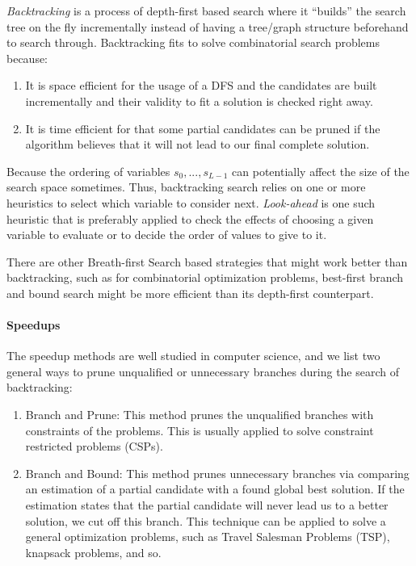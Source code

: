 \documentclass[../main.tex]{subfiles}
\begin{document}
\textit{Backtracking} is a process of depth-first based search where it ``builds'' the search tree on the fly incrementally instead of having a tree/graph structure beforehand  to search through. Backtracking fits to solve combinatorial search problems because:
\begin{enumerate}
    \item It is space efficient for the usage of a DFS and the candidates are built incrementally and their validity to fit a solution is checked right away.
    \item It is time efficient for that some partial candidates can be pruned if the algorithm believes that it will not lead to our final complete solution. 
\end{enumerate}

 Because the ordering of variables $s_0, ..., s_{L-1}$ can potentially affect the size of the search space sometimes. Thus, backtracking search relies on one or more heuristics to select which variable to consider next. \textit{Look-ahead} is one such heuristic that is preferably applied to check the effects of choosing a given variable to evaluate or to decide the order of values to give to it. 
 
 There are other Breath-first Search based strategies that might work better than backtracking, such as  for combinatorial optimization problems, best-first branch and bound search might be more efficient than its depth-first counterpart. 

\paragraph{Speedups}

The speedup methods are well studied in computer science, and we list two general ways to prune unqualified or unnecessary branches during the search of backtracking:
\begin{enumerate}
    \item Branch and Prune: This method prunes the unqualified branches with constraints of the problems. This is usually applied to solve constraint restricted problems (CSPs).
    \item Branch and Bound: This method prunes unnecessary branches via comparing an estimation of a partial candidate with a found global best solution. If the estimation states that the partial candidate will never lead us to a better solution, we cut off this branch. This technique can be applied to solve a general optimization problems, such as Travel Salesman Problems (TSP), knapsack problems, and so.
\end{enumerate}
\end{document}
